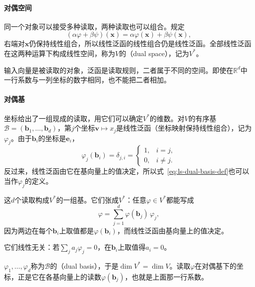 \paragraph{对偶空间}
同一个对象可以接受多种读取，两种读取也可以组合。规定
\[
 (\alpha\varphi+\beta\psi)(\bm x)=\alpha\varphi(\bm x)+\beta\psi(\bm x),
\]
右端对$\bm x$仍保持线性组合，所以线性泛函的线性组合仍是线性泛函。全部线性泛函在这两种运算下构成线性空间，称为$V$的（dual space），记为$V^*$。

输入向量是被读取的对象，泛函是读取规则，二者属于不同的空间。即使在$\mathbb R^d$中一行系数与一列坐标的数字相同，也不能把二者相加。

\paragraph{对偶基}
坐标给出了一组现成的读取，用它们可以确定$V^*$的维数。对$V$的有序基$\mathcal B=(\bm b_1,\ldots,\bm b_d)$，第$j$个坐标$\bm v\mapsto x_j$是线性泛函（坐标映射保持线性组合），记为$\varphi_j$。由于$\bm b_i$的坐标是$\bm e_i$，
\begin{equation}
 \varphi_j(\bm b_i)=\delta_{j,i}
 =\begin{cases}1,&i=j,\\0,&i\neq j.\end{cases}
 \label{eq:ls-dual-basis-def}
\end{equation}
反过来，线性泛函由它在基向量上的值决定，所以式~\eqref{eq:ls-dual-basis-def}也可以当作$\varphi_j$的定义。

这$d$个读取构成$V^*$的一组基。它们张成$V^*$：任意$\varphi\in V^*$都能写成
\[
 \varphi=\sum_{j=1}^d\varphi(\bm b_j)\,\varphi_j,
\]
因为两边在每个$\bm b_i$上取值都是$\varphi(\bm b_i)$，而线性泛函由基向量上的值决定。

它们线性无关：若$\sum_ja_j\varphi_j=0$，在$\bm b_i$上取值得$a_i=0$。

$\varphi_1,\ldots,\varphi_d$称为$\mathcal B$的（dual basis），于是$\dim V^*=\dim V$。读取$\varphi$在对偶基下的坐标，正是它在各基向量上的读数$\varphi(\bm b_j)$，也就是上面那一行系数。


